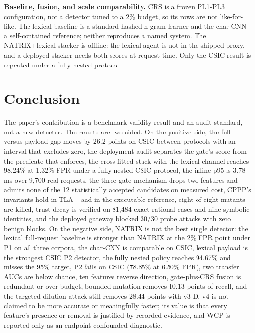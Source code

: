 \documentclass[preprint,11pt]{elsarticle}
\begin{document}
\textbf{Baseline, fusion, and scale comparability.} CRS is a frozen
PL1-PL3 configuration, not a detector tuned to a 2\% budget, so its rows
are not like-for-like. The lexical baseline is a standard hashed n-gram
learner and the char-CNN a self-contained reference; neither reproduces
a named system. The NATRIX+lexical stacker is offline: the lexical agent
is not in the shipped proxy, and a deployed stacker needs both scores at
request time. Only the CSIC result is repeated under a fully nested
protocol.

\section{Conclusion}\label{conclusion}

The paper's contribution is a benchmark-validity result and an audit
standard, not a new detector. The results are two-sided. On the positive
side, the full-versus-payload gap moves by 26.2 points on CSIC between
protocols with an interval that excludes zero, the deployment audit
separates the gate's score from the predicate that enforces, the
cross-fitted stack with the lexical channel reaches 98.24\% at 1.32\%
FPR under a fully nested CSIC protocol, the inline p95 is 3.78 ms over
9,700 real requests, the three-gate mechanism drops two features and
admits none of the 12 statistically accepted candidates on measured
cost, CPPP's invariants hold in TLA+ and in the executable reference,
eight of eight mutants are killed, trust decay is verified on 81,484
exact-rational cases and nine symbolic identities, and the deployed
gateway blocked 30/30 probe attacks with zero benign blocks. On the
negative side, NATRIX is not the best single detector: the lexical
full-request baseline is stronger than NATRIX at the 2\% FPR point under
P1 on all three corpora, the char-CNN is comparable on CSIC, lexical
payload is the strongest CSIC P2 detector, the fully nested policy
reaches 94.67\% and misses the 95\% target, P2 fails on CSIC (78.85\% at
6.50\% FPR), two transfer AUCs are below chance, ten features reverse
direction, gate-plus-CRS fusion is redundant or over budget, bounded
mutation removes 10.13 points of recall, and the targeted dilution
attack still removes 28.44 points with v3-D. v4 is not claimed to be
more accurate or meaningfully faster; its value is that every feature's
presence or removal is justified by recorded evidence, and WCP is
reported only as an endpoint-confounded diagnostic.
\end{document}
